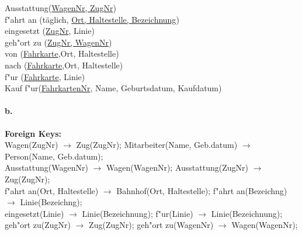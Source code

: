 \documentclass[12pt]{article}
\newcommand{\arrowright}{$\longrightarrow$ }
\begin{document}
	 	Ausstattung(\underline{WagenNr, ZugNr})\\[1.2em]
	 	
	 	f"ahrt an (täglich, \underline{Ort, Haltestelle, Bezeichnung})\\[1.2em]
	 	
	 	eingesetzt (\underline{ZugNr}, Linie)\\[1.2em]
	 	
	 	geh"ort zu (\underline{ZugNr, WagenNr})\\[1.2em]
	 	
	 	von (\underline{Fahrkarte},Ort, Haltestelle)\\[1.2em]
	 	
	 	nach (\underline{Fahrkarte},Ort, Haltestelle)\\[1.2em]
	 	
	 	f"ur (\underline{Fahrkarte}, Linie)\\[1.2em]
	 	
	 	Kauf f"ur(\underline{FahrkartenNr}, Name, Geburtsdatum, Kaufdatum)\\[2 em]	 	
	 	
	 	
 	
 	\paragraph*{b.}	
 	
 	\textbf{Foreign Keys:}\\
 	
 	Wagen(ZugNr) \arrowright Zug(ZugNr); Mitarbeiter(Name, Geb.datum) \arrowright Person(Name, Geb.datum);\\[1.1em]
 	
 	Ausstattung(WagenNr) \arrowright Wagen(WagenNr); Ausstattung(ZugNr) \arrowright Zug(ZugNr);\\[1.1em]
 	
 	f"ahrt an(Ort, Haltestelle) \arrowright Bahnhof(Ort, Haltestelle);  f"ahrt an(Bezeichng) \arrowright Linie(Bezeichng);\\[1.1em]
 	
 	eingesetzt(Linie) \arrowright Linie(Bezeichnung); f"ur(Linie) \arrowright Linie(Bezeichnung);\\[1.1em]
 	
 	geh"ort zu(ZugNr) \arrowright Zug(ZugNr); geh"ort zu(WagenNr) \arrowright Wagen(WagenNr);\\[1.1em]
 	
\end{document}
